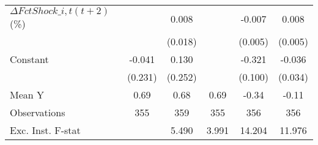 {\begin{tabular}{l*{5}{c}}
\addlinespace
$ \Delta FctShock\_{i,t}(t+2)$ (\%)&                     &       0.008         &                     &      -0.007         &       0.008         \\
                    &                     &     (0.018)         &                     &     (0.005)         &     (0.005)         \\
\addlinespace
Constant            &      -0.041         &       0.130         &                     &      -0.321\sym{***}&      -0.036         \\
                    &     (0.231)         &     (0.252)         &                     &     (0.100)         &     (0.034)         \\
\midrule
Mean Y              &        0.69         &        0.68         &        0.69         &       -0.34         &       -0.11         \\
Observations        &         355         &         359         &         355         &         356         &         356         \\
Exc. Inst. F-stat   &                     &       5.490         &       3.991         &      14.204         &      11.976         \\
\bottomrule
\end{tabular}
}
